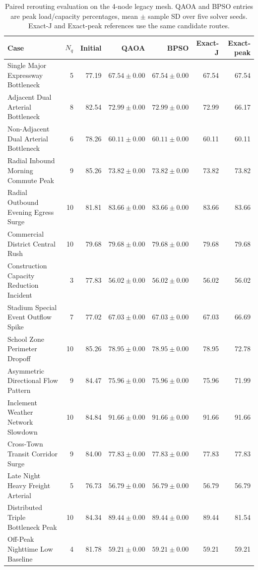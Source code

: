 \begin{table}[ht]
\centering\small
\caption{Paired rerouting evaluation on the 4-node legacy mesh. QAOA and BPSO entries are peak load/capacity percentages, mean $\pm$ sample SD over five solver seeds. Exact-J and Exact-peak references use the same candidate routes.}
\label{tab:yash_legacy_4}
\begin{tabular}{lrrrrrr}
\hline
Case & $N_q$ & Initial & QAOA & BPSO & Exact-J & Exact-peak \\ \hline
Single Major Expressway Bottleneck & 5 & 77.19 & $67.54\pm0.00$ & $67.54\pm0.00$ & 67.54 & 67.54 \\
Adjacent Dual Arterial Bottleneck & 8 & 82.54 & $72.99\pm0.00$ & $72.99\pm0.00$ & 72.99 & 66.17 \\
Non-Adjacent Dual Arterial Bottleneck & 6 & 78.26 & $60.11\pm0.00$ & $60.11\pm0.00$ & 60.11 & 60.11 \\
Radial Inbound Morning Commute Peak & 9 & 85.26 & $73.82\pm0.00$ & $73.82\pm0.00$ & 73.82 & 73.82 \\
Radial Outbound Evening Egress Surge & 10 & 81.81 & $83.66\pm0.00$ & $83.66\pm0.00$ & 83.66 & 83.66 \\
Commercial District Central Rush & 10 & 79.68 & $79.68\pm0.00$ & $79.68\pm0.00$ & 79.68 & 79.68 \\
Construction Capacity Reduction Incident & 3 & 77.83 & $56.02\pm0.00$ & $56.02\pm0.00$ & 56.02 & 56.02 \\
Stadium Special Event Outflow Spike & 7 & 77.02 & $67.03\pm0.00$ & $67.03\pm0.00$ & 67.03 & 66.69 \\
School Zone Perimeter Dropoff & 10 & 85.26 & $78.95\pm0.00$ & $78.95\pm0.00$ & 78.95 & 72.78 \\
Asymmetric Directional Flow Pattern & 9 & 84.47 & $75.96\pm0.00$ & $75.96\pm0.00$ & 75.96 & 71.99 \\
Inclement Weather Network Slowdown & 10 & 84.84 & $91.66\pm0.00$ & $91.66\pm0.00$ & 91.66 & 91.66 \\
Cross-Town Transit Corridor Surge & 9 & 84.00 & $77.83\pm0.00$ & $77.83\pm0.00$ & 77.83 & 77.83 \\
Late Night Heavy Freight Arterial & 5 & 76.73 & $56.79\pm0.00$ & $56.79\pm0.00$ & 56.79 & 56.79 \\
Distributed Triple Bottleneck Peak & 10 & 84.34 & $89.44\pm0.00$ & $89.44\pm0.00$ & 89.44 & 81.54 \\
Off-Peak Nighttime Low Baseline & 4 & 81.78 & $59.21\pm0.00$ & $59.21\pm0.00$ & 59.21 & 59.21 \\
\hline
\end{tabular}
\end{table}


